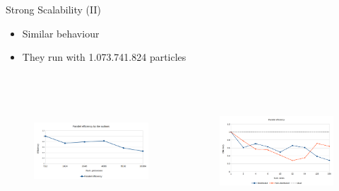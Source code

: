 \documentclass[aspectratio=169]{bredelebeamer}
\begin{document}
\begin{frame}{Strong Scalability (II)}
\begin{itemize}
	\item Similar behaviour
	\item They run with 1.073.741.824 particles
\end{itemize}

\begin{columns}

\begin{figure}[h!]
\centering
\includegraphics[width=6cm,height=5cm, keepaspectratio=1]{"./img/introduction/strong_scalability_efficiency_authos"}
\end{figure}

\begin{figure}[h!]
\centering
\includegraphics[width=6cm,height=5cm, keepaspectratio=1]{"./img/introduction/strong_scalability_efficiency"}
\end{figure}


\end{columns}

\end{frame}
\end{document}
